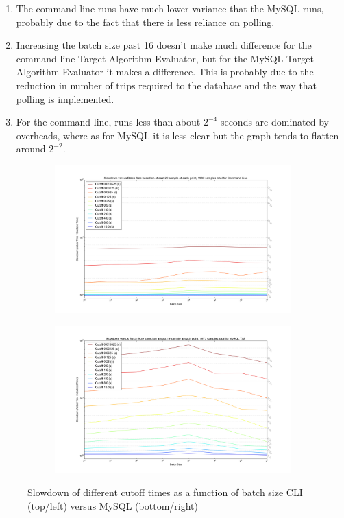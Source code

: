 \documentclass[11pt,letterpaper,oneside]{article}
\begin{document}
\begin{enumerate}

\item The command line runs have much lower variance that the MySQL runs, probably due to the fact that there is less reliance on polling.

\item Increasing the batch size past 16 doesn't make much difference for the command line Target Algorithm Evaluator, but for the MySQL Target Algorithm Evaluator it makes a difference. This is probably due to the reduction in number of trips required to the database and the way that polling is implemented.

\item For the command line, runs less than about $2^{-4}$ seconds are dominated by overheads, where as for MySQL it is less clear but the graph tends to flatten around $2^{-2}$.

\end{enumerate}


\begin{figure}
\centering
\begin{subfigure}
  \centering
  \includegraphics[width=480px]{img/plots/overheadVsBatchSize-cli}

\end{subfigure}%
\begin{subfigure}
  \centering
  \includegraphics[width=480px]{img/plots/overheadVsBatchSize-mysql}

\end{subfigure}
\caption{Slowdown of different cutoff times as a function of batch size CLI (top/left) versus MySQL (bottom/right)}
\label{overheadBatch}
\end{figure}
\end{document}
